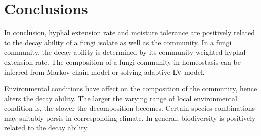 \section{Conclusions}\label{sec:conclu}

In conclusion, hyphal extension rate and moisture tolerance are positively related to the decay ability of a fungi isolate as well as the community. In a fungi community, the decay ability is determined by its community-weighted hyphal extension rate. The composition of a fungi community in homeostasis can be inferred from Markov chain model or solving adaptive LV-model.

Environmental conditions have affect on the composition of the community, hence alters the decay ability. The larger the varying range of local environmental condition is, the slower the decomposition becomes. Certain species combinations may suitably persis in corresponding climate. In general, biodiversity is positively related to the decay ability.
